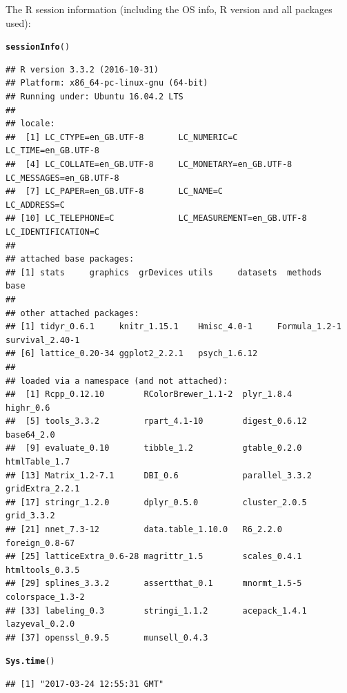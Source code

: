 \documentclass{article}\usepackage[]{graphicx}\usepackage[]{color}
\makeatletter
\newcommand{\hlstd}[1]{\textcolor[rgb]{0.345,0.345,0.345}{#1}}%
\newcommand{\hlkwd}[1]{\textcolor[rgb]{0.737,0.353,0.396}{\textbf{#1}}}%
\newenvironment{kframe}{%
 \def\at@end@of@kframe{}%
 \ifinner\ifhmode%
  \def\at@end@of@kframe{\end{minipage}}%
  \begin{minipage}{\columnwidth}%
 \fi\fi%
 \def\FrameCommand##1{\hskip\@totalleftmargin \hskip-\fboxsep
 \colorbox{shadecolor}{##1}\hskip-\fboxsep
     \hskip-\linewidth \hskip-\@totalleftmargin \hskip\columnwidth}%
 \MakeFramed {\advance\hsize-\width
   \@totalleftmargin\z@ \linewidth\hsize
   \@setminipage}}%
 {\par\unskip\endMakeFramed%
 \at@end@of@kframe}
\newenvironment{knitrout}{}{} %
\makeatother
\begin{document}
The R session information (including the OS info, R version and all
packages used):

\begin{knitrout}
\color{fgcolor}\begin{kframe}
\begin{alltt}
\hlkwd{sessionInfo}\hlstd{()}
\end{alltt}
\begin{verbatim}
## R version 3.3.2 (2016-10-31)
## Platform: x86_64-pc-linux-gnu (64-bit)
## Running under: Ubuntu 16.04.2 LTS
## 
## locale:
##  [1] LC_CTYPE=en_GB.UTF-8       LC_NUMERIC=C               LC_TIME=en_GB.UTF-8       
##  [4] LC_COLLATE=en_GB.UTF-8     LC_MONETARY=en_GB.UTF-8    LC_MESSAGES=en_GB.UTF-8   
##  [7] LC_PAPER=en_GB.UTF-8       LC_NAME=C                  LC_ADDRESS=C              
## [10] LC_TELEPHONE=C             LC_MEASUREMENT=en_GB.UTF-8 LC_IDENTIFICATION=C       
## 
## attached base packages:
## [1] stats     graphics  grDevices utils     datasets  methods   base     
## 
## other attached packages:
## [1] tidyr_0.6.1     knitr_1.15.1    Hmisc_4.0-1     Formula_1.2-1   survival_2.40-1
## [6] lattice_0.20-34 ggplot2_2.2.1   psych_1.6.12   
## 
## loaded via a namespace (and not attached):
##  [1] Rcpp_0.12.10        RColorBrewer_1.1-2  plyr_1.8.4          highr_0.6          
##  [5] tools_3.3.2         rpart_4.1-10        digest_0.6.12       base64_2.0         
##  [9] evaluate_0.10       tibble_1.2          gtable_0.2.0        htmlTable_1.7      
## [13] Matrix_1.2-7.1      DBI_0.6             parallel_3.3.2      gridExtra_2.2.1    
## [17] stringr_1.2.0       dplyr_0.5.0         cluster_2.0.5       grid_3.3.2         
## [21] nnet_7.3-12         data.table_1.10.0   R6_2.2.0            foreign_0.8-67     
## [25] latticeExtra_0.6-28 magrittr_1.5        scales_0.4.1        htmltools_0.3.5    
## [29] splines_3.3.2       assertthat_0.1      mnormt_1.5-5        colorspace_1.3-2   
## [33] labeling_0.3        stringi_1.1.2       acepack_1.4.1       lazyeval_0.2.0     
## [37] openssl_0.9.5       munsell_0.4.3
\end{verbatim}
\begin{alltt}
\hlkwd{Sys.time}\hlstd{()}
\end{alltt}
\begin{verbatim}
## [1] "2017-03-24 12:55:31 GMT"
\end{verbatim}
\end{kframe}
\end{knitrout}
\end{document}
